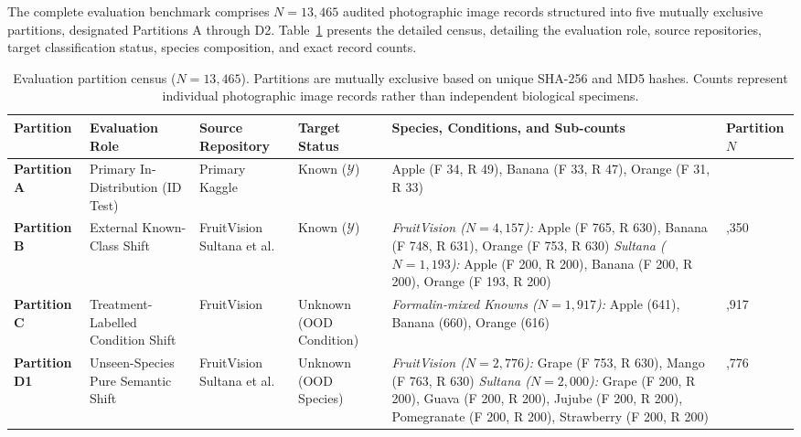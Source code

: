 The complete evaluation benchmark comprises $N = 13,465$ audited photographic image records structured into five mutually exclusive partitions, designated Partitions A through D2. Table~\ref{tab:partition_census} presents the detailed census, detailing the evaluation role, source repositories, target classification status, species composition, and exact record counts.

\begin{table}[!t]
\caption{Evaluation partition census ($N = 13,465$). Partitions are mutually exclusive based on unique SHA-256 and MD5 hashes. Counts represent individual photographic image records rather than independent biological specimens.}
\label{tab:partition_census}
\centering
\footnotesize
\setlength{\tabcolsep}{2.5pt}
\begin{tabular}{>{\raggedright\arraybackslash}p{1.4cm} >{\raggedright\arraybackslash}p{2.8cm} >{\raggedright\arraybackslash}p{2.4cm} >{\raggedright\arraybackslash}p{1.8cm} >{\raggedright\arraybackslash}p{5.0cm} >{\centering\arraybackslash}p{1.4cm}}
\toprule
\textbf{Partition} & \textbf{Evaluation Role} & \textbf{Source Repository} & \textbf{Target Status} & \textbf{Species, Conditions, and Sub-counts} & \textbf{Partition $N$} \\
\midrule
\textbf{Partition A} & Primary In-Distribution (ID Test) & Primary Kaggle & Known ($\mathcal{Y}$) & Apple (F 34, R 49), Banana (F 33, R 47), Orange (F 31, R 33) & 227 \\
\midrule
\textbf{Partition B} & External Known-Class Shift & FruitVision \newline Sultana et al. & Known ($\mathcal{Y}$) & \textit{FruitVision ($N = 4,157$):} Apple (F 765, R 630), Banana (F 748, R 631), Orange (F 753, R 630) \newline \textit{Sultana ($N = 1,193$):} Apple (F 200, R 200), Banana (F 200, R 200), Orange (F 193, R 200) & 5,350 \\
\midrule
\textbf{Partition C} & Treatment-Labelled Condition Shift & FruitVision & Unknown (OOD Condition) & \textit{Formalin-mixed Knowns ($N = 1,917$):} \newline Apple (641), Banana (660), Orange (616) & 1,917 \\
\midrule
\textbf{Partition D1} & Unseen-Species Pure Semantic Shift & FruitVision \newline Sultana et al. & Unknown (OOD Species) & \textit{FruitVision ($N = 2,776$):} Grape (F 753, R 630), Mango (F 763, R 630) \newline \textit{Sultana ($N = 2,000$):} Grape (F 200, R 200), Guava (F 200, R 200), Jujube (F 200, R 200), Pomegranate (F 200, R 200), Strawberry (F 200, R 200) & 4,776 \\

\end{tabular}
\end{table}
